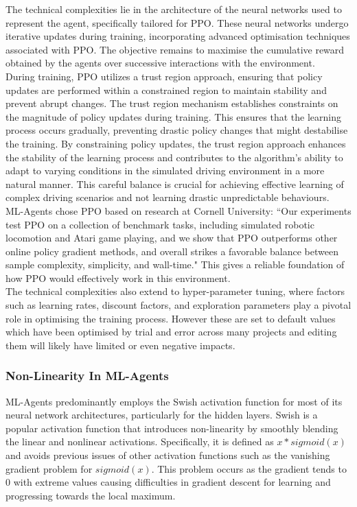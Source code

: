 \documentclass{article}
\begin{document}
 The technical complexities lie in the architecture of the neural networks used to represent the agent, specifically tailored for PPO. These neural networks undergo iterative updates during training, incorporating advanced optimisation techniques associated with PPO. The objective remains to maximise the cumulative reward obtained by the agents over successive interactions with the environment.\\

 During training, PPO utilizes a trust region approach, ensuring that policy updates are performed within a constrained region to maintain stability and prevent abrupt changes. The trust region mechanism establishes constraints on the magnitude of policy updates during training. This ensures that the learning process occurs gradually, preventing drastic policy changes that might destabilise the training. By constraining policy updates, the trust region approach enhances the stability of the learning process and contributes to the algorithm's ability to adapt to varying conditions in the simulated driving environment in a more natural manner. This careful balance is crucial for achieving effective learning of complex driving scenarios and not learning drastic unpredictable behaviours.\\

 ML-Agents chose PPO based on research at Cornell University: ``Our experiments test PPO on a collection of benchmark tasks, including simulated robotic locomotion and Atari game playing, and we show that PPO outperforms other online policy gradient methods, and overall strikes a favorable balance between sample complexity, simplicity, and wall-time." \cite{PPO-Algorithms} This gives a reliable foundation of how PPO would effectively work in this environment.\\

 The technical complexities also extend to hyper-parameter tuning, where factors such as learning rates, discount factors, and exploration parameters play a pivotal role in optimising the training process. However these are set to default values which have been optimised by trial and error across many projects and editing them will likely have limited or even negative impacts.

\subsubsection{Non-Linearity In ML-Agents}
ML-Agents predominantly employs the Swish activation function for most of its neural network architectures, particularly for the hidden layers. Swish is a popular activation function that introduces non-linearity by smoothly blending the linear and nonlinear activations. Specifically, it is defined as $x*sigmoid(x)$ and avoids previous issues of other activation functions such as the vanishing gradient problem for $sigmoid(x)$. This problem occurs as the gradient tends to 0 with extreme values causing difficulties in gradient descent for learning and progressing towards the local maximum.\\ 
\end{document}
